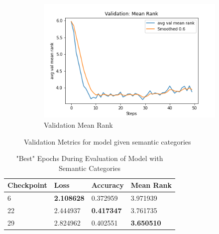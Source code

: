 \begin{figure}[ht!]
\begin{subfigure}[b]{0.3\textwidth}
         \label{fig:category_loss}
     \end{subfigure}
     \hfill
     \begin{subfigure}[b]{0.3\textwidth}
         \centering
         \includegraphics[width=\textwidth]{./figure/results/semantic_categories/eval/avg val mean rank.png}
         \caption{Validation Mean Rank}
         \label{fig:category_mean_rank}
     \end{subfigure}
     \caption{Validation Metrics for model given semantic categories}
     \label{fig:category_metrics}
\end{figure}

\begin{table}[ht!]
\centering
\caption{"Best" Epochs During Evaluation of Model with Semantic Categories}
\begin{tabular}{l | l | l | l}
Checkpoint & Loss & Accuracy & Mean Rank \\
\hline
6 & \textbf{2.108628} & 0.372959 & 3.971939 \\
22 & 2.444937 & \textbf{0.417347} & 3.761735 \\
29 & 2.824962 & 0.402551 & \textbf{3.650510} 
\end{tabular}
\label{tab:best_category}
\end{table}


